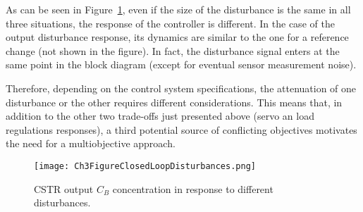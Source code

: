 As can be seen in Figure~\ref{ch3:fig:Ch3FigureClosedLoopDisturbances}, even if the size of the disturbance is the same in all three situations, the response of the controller is different. In the case of the output disturbance response, its dynamics are similar to the one for a reference change (not shown in the figure). In fact, the disturbance signal enters at the same point in the block diagram (except for eventual sensor measurement noise).

Therefore, depending on the control system specifications, the attenuation of one disturbance or the other requires different considerations. This means that, in addition to the other two trade-offs just presented above (servo an load regulations responses), a third potential source of conflicting objectives motivates the need for a multiobjective approach.
%
\begin{figure}[tb]
    \begin{center}
        \texttt{[image: Ch3FigureClosedLoopDisturbances.png]}
        \caption{CSTR output $C_B$ concentration in response to different disturbances.}
        \label{ch3:fig:Ch3FigureClosedLoopDisturbances}
    \end{center}
\end{figure}
%

